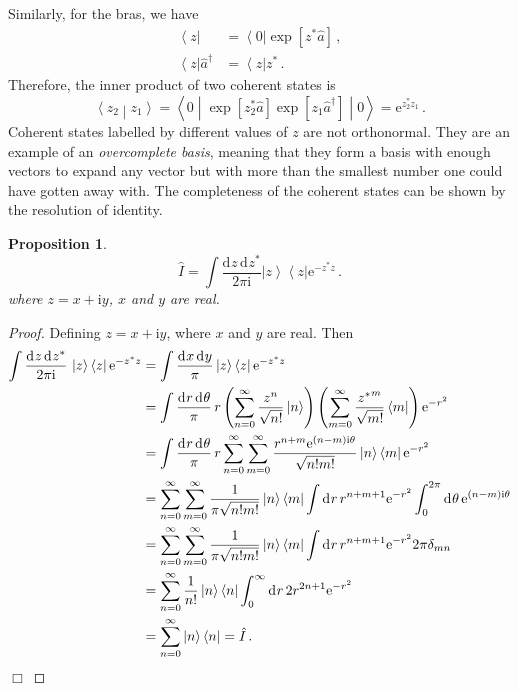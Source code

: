 \documentclass{article}
\theoremstyle{plain}\theoremheaderfont{\normalfont\itshape}\theorembodyfont{\rmfamily}\theoremseparator{.}\newtheorem*{rem}{Remark}\newtheorem*{ex}{Example}\newtheorem*{proof}{Proof}\newtheorem*{altp}{Alternative proof}
\theoremstyle{plain}\theoremheaderfont{\normalfont\bfseries}\theorembodyfont{\rmfamily}\theoremseparator{.}\newtheorem{thm}{Theorem}[section]\newtheorem{lem}[thm]{Lemma}\newtheorem{prop}[thm]{Proposition}\newtheorem*{cor}{Corollary}\newtheorem{defn}[thm]{Definition}\newtheorem{clm}[thm]{Claim}\newtheorem{clminproof}{Claim}
\theoremstyle{break}\theoremheaderfont{\normalfont\itshape}\theorembodyfont{\rmfamily}\theoremseparator{.\medskip}\newtheorem*{proofskip}{Proof}\newtheorem*{exs}{Examples}\newtheorem*{rems}{Remarks}
\theoremstyle{break}\theoremheaderfont{\normalfont\bfseries}\theorembodyfont{\rmfamily}\theoremseparator{.\medskip}\newtheorem{lemskip}[thm]{Lemma}\newtheorem{defnskip}[thm]{Definition}\newtheorem{propskip}[thm]{Proposition}\newtheorem{thmskip}[thm]{Theorem}
\numberwithin{equation}{section}
\newcommand{\qed}{\hfill\ensuremath{\Box}}
\newcommand{\ii}{\mathrm{i}}
\newcommand{\ee}{\mathrm{e}}
\newcommand{\dd}[2][]{\mathrm{d}^{#1} #2\,}
\renewcommand{\d}[2][]{\mathrm{d}^{#1} #2}
\newcommand{\bra}[1]{\left\langle #1 \right|}
\newcommand{\ket}[1]{\left| #1 \right\rangle}
\newcommand{\braket}[2]{\left\langle #1 \middle| #2 \right\rangle}
\newcommand{\mel}[3]{\left\langle #1 \middle| #2 \middle| #3 \right\rangle}
\newcommand{\rai}{\hat{a}^\dagger}
\newcommand{\low}{\hat{a}}
\begin{document}
    Similarly, for the bras, we have
    \begin{align}
        \bra{z}&=\bra{0}\exp[z^*\low]\,,\\
        \bra{z}\rai&=\bra{z}z^*\,.\label{lower_coherent_dagger}
    \end{align}
    Therefore, the inner product of two coherent states is
    \begin{equation}
        \braket{z_2}{z_1}=\mel{0}{\exp[z_2^*\low]\exp[z_1\rai]}{0}=\ee^{z_2^* z_1}\,.
    \end{equation}
    Coherent states labelled by different values of \(z\) are not orthonormal. They are an example of an \textit{overcomplete basis}, meaning that they form a basis with enough vectors to expand any vector but with more than the smallest number one could have gotten away with. The completeness of the coherent states can be shown by the resolution of identity.
    \begin{prop}
        \begin{equation}
            \hat{I}=\int\frac{\dd{z}\d{z^*}}{2\pi\ii}\ket{z}\bra{z}\ee^{-z^* z}\,.\label{coherent_identity}
        \end{equation}
        where \(z=x+\ii y\), \(x\) and \(y\) are real. 
    \end{prop}
    \begin{proof}
        Defining \(z=x+\ii y\), where \(x\) and \(y\) are real. Then
        \begin{align}
            \int\frac{\dd{z}\d{z^*}}{2\pi\ii}\, \ket{z}\bra{z}\ee^{-z^* z}&=\int\frac{\dd{x}\d{y}}{\pi}\ket{z}\bra{z}\ee^{-z^* z}\notag \\
            &=\int\frac{\dd{r}\d{\theta}}{\pi}\, r\left(\sum_{n=0}^{\infty}\frac{z^n}{\sqrt{n!}}\ket{n}\right)\left(\sum_{m=0}^{\infty}\frac{{z^*}^m}{\sqrt{m!}}\bra{m}\right)\ee^{-r^2}\notag \\
            &=\int\frac{\dd{r}\d{\theta}}{\pi}\, r\sum_{n=0}^{\infty}\sum_{m=0}^{\infty}\frac{r^{n+m}\ee^{(n-m)\ii\theta}}{\sqrt{n!m!}}\ket{n}\bra{m}\ee^{-r^2}\notag \\
            &=\sum_{n=0}^{\infty}\sum_{m=0}^{\infty}\frac{1}{\pi\sqrt{n!m!}}\ket{n}\bra{m}\int\dd{r}r^{n+m+1}\ee^{-r^2}\int_{0}^{2\pi}\dd{\theta}\ee^{(n-m)\ii\theta}\notag\\
            &=\sum_{n=0}^{\infty}\sum_{m=0}^{\infty}\frac{1}{\pi\sqrt{n!m!}}\ket{n}\bra{m}\int\dd{r}r^{n+m+1}\ee^{-r^2}2\pi\delta_{mn}\notag \\
            &=\sum_{n=0}^{\infty}\frac{1}{n!}\ket{n}\bra{n}\int_{0}^{\infty}\dd{r} 2r^{2n+1}\ee^{-r^2}\notag\\
            &=\sum_{n=0}^{\infty}\ket{n}\bra{n}=\hat{I}\,.
        \end{align}\qed
    \end{proof}
\end{document}
